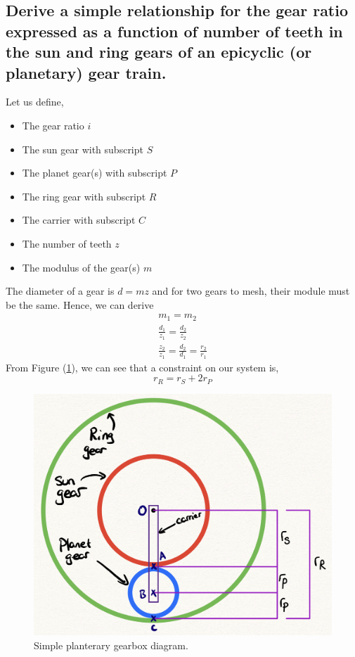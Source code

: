 \documentclass[12pt]{article}
\numberwithin{equation}{section}
\begin{document}
\begin{flushleft}
\subsection{Derive a simple relationship for the gear ratio expressed as a function of number of teeth in the sun and ring gears of an epicyclic (or planetary) gear train.}
Let us define,
\begin{itemize} 
  \item The gear ratio $i$
  \item The sun gear with subscript $S$
  \item The planet gear(s) with subscript $P$ 
  \item The ring gear with subscript $R$
  \item The carrier with subscript $C$
  \item The number of teeth $z$
  \item The modulus of the gear(s) $m$
\end{itemize}

The diameter of a gear is $d = mz$ and for two gears to mesh, their module must be the same. Hence, we can derive
\begin{gather}
  m_1 = m_2\\
  \frac{d_1}{z_1} = \frac{d_2}{z_2}\\
  \frac{z_2}{z_1} = \frac{d_2}{d_1} = \frac{r_2}{r_1}
\end{gather}
From Figure (\ref{SystemRadii}), we can see that a constraint on our system is,
\begin{equation}
  r_R = r_S + 2r_P
  \label{radiiRelationship}
\end{equation}

\begin{figure}[h]
  \centering
  \includegraphics[width = 0.7 \textwidth]{./img/GearRadii.png}
  \caption{Simple planterary gearbox diagram.}
  \label{SystemRadii}
\end{figure}


\end{flushleft}
\end{document}
